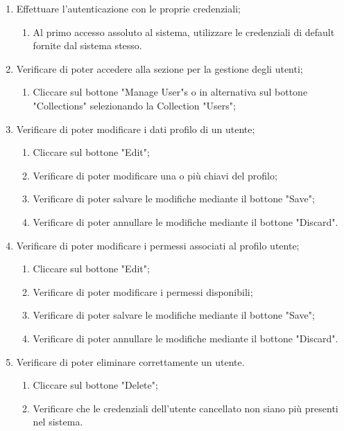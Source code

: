 \begin{enumerate}
\item Effettuare l'autenticazione con le proprie credenziali;
\begin{enumerate}
\item Al primo accesso assoluto al sistema, utilizzare le credenziali di default fornite dal sistema stesso.
\end{enumerate}
\item Verificare di poter accedere alla sezione per la gestione degli utenti;
\begin{enumerate}
\item Cliccare sul bottone "Manage User"s o in alternativa sul bottone "Collections" selezionando la Collection "Users";
\end{enumerate}
\item Verificare di poter modificare i dati profilo di un utente;
\begin{enumerate}
\item Cliccare sul bottone "Edit";
\item Verificare di poter modificare una o più chiavi del profilo;
\item Verificare di poter salvare le modifiche mediante il bottone "Save";
\item Verificare di poter annullare le modifiche mediante il bottone "Discard".
\end{enumerate}
\item Verificare di poter modificare i permessi associati al profilo utente;
\begin{enumerate}
\item Cliccare sul bottone "Edit";
\item Verificare di poter modificare i permessi disponibili;
\item Verificare di poter salvare le modifiche mediante il bottone "Save";
\item Verificare di poter annullare le modifiche mediante il bottone "Discard".
\end{enumerate}
\item Verificare di poter eliminare correttamente un utente.
\begin{enumerate}
\item Cliccare sul bottone "Delete";
\item Verificare che le credenziali dell'utente cancellato non siano più presenti nel sistema.
\end{enumerate}
\end{enumerate}


